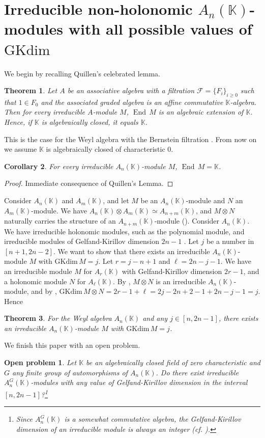 \documentclass[12pt, a4paper]{amsart}
\newtheorem{theorem}{Theorem}[section]
\newtheorem{corollary}[theorem]{Corollary}
\newtheorem*{problem}{Open problem}
\newcommand{\Weyl}{A_n(\mathbb{K})} %
\newcommand{\Invar}{A_n^G(\mathbb{K})}           %
\newcommand{\GKdim}{\text{GKdim}}    %
\def\k{\mathbb K}
\def\k{\mathbb K}
\def\KK{\mathbb K}
\begin{document}
\section{Irreducible non-holonomic $\Weyl$-modules with all possible values of $\GKdim$}
We begin by recalling Quillen's celebrated lemma.
\begin{theorem}\cite{Quillen}
    Let $A$ be an associative algebra with a filtration $\mathcal{F}=\{F_i\}_{i\geq 0}$ such that $1\in F_0$ and the associated graded algebra is an affine commutative $\KK$-algebra. Then for every irreducible $A$-module $M$, $\operatorname{End} \, M$ is an algebraic extension of $\KK$. Hence, if $\KK$ is algebraically closed, it equals $\KK$.
\end{theorem}
This is the case for the Weyl algebra with the Bernstein filtration \cite[Theorem 7.3.1]{Coutinho}.
From now on we assume $\KK$ is algebraically closed of characteristic $0$.
\begin{corollary}\label{appb-corol-1}
    For every irreducible $\Weyl$-module $M$, $\operatorname{End} \, M=\KK$.
\end{corollary}
\begin{proof}
    Immediate consequence of Quillen's Lemma.
\end{proof}
Consider $A_n(\KK)$ and $A_m(\KK)$, and let $M$ be an $A_n(\KK)$-module and $N$ an $A_m(\KK)$-module. We have $A_n(\k) \otimes A_m(\k) \simeq A_{n+m}(\k)$, and $M \otimes N$ naturally carries the structure of an $A_{n+m}(\k)$-module (\cite[Chapter 13]{Coutinho}).
Consider $\Weyl$. We have irreducible holonomic modules, such as the polynomial module, and irreducible modules of Gelfand-Kirillov dimension $2n-1$ 
\cite{Stafford}. Let $j$ be a number in $[n+1,2n-2]$. We want to show that there exists an irreducible $\Weyl$-module $M$ with $\GKdim \, M=j$. Let $r=j-n+1$ and $\ell=2n-j-1$. We have an irreducible module $M$ for $A_r(\k)$ with Gelfand-Kirillov dimension $2r-1$, and a holonomic module $N$ for $A_\ell(\k)$. By \cite[Theorem 1]{Bavula1}, $M \otimes N$ is an irreducible $\Weyl$-module, and by \cite[Theorem 13.4.1(1)]{Coutinho}, $\GKdim \, M \otimes N=2r-1+\ell=2j-2n+2-1+2n-j-1=j$.
Hence
\begin{theorem}\label{Olivier}
    For the Weyl algebra $\Weyl$ and any $j \in [n,2n-1]$, there exists an irreducible $\Weyl$-module $M$ with $\GKdim \, M=j$.
\end{theorem}
We finish this paper with an open problem.
\begin{problem}
Let $\k$ be an algebraically closed field of zero characteristic and $G$ any finite group of automorphisms of $\Weyl$. Do there exist irreducible $\Invar$-modules with any value of Gelfand-Kirillov dimension in the interval $[n,2n-1]$?\footnote{Since $\Invar$ is a somewhat commutative algebra, the Gelfand-Kirillov dimension of an irreducible module is always an integer (cf. \cite[Section 8.6]{McConnell}).}
\end{problem}
\end{document}
